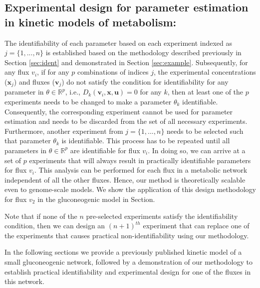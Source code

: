 \documentclass[10pt]{article}
\begin{document}
\subsection{Experimental design for parameter estimation in kinetic models of metabolism:}
The identifiability of each parameter based on each experiment indexed as $j = \{1, ..., n\}$ is established based on the methodology described previously in Section \ref{sec:ident} and demonstrated in Section \ref{sec:example}. Subsequently, for any flux $v_i$, if for any $p$ combinations of indices $j$, the experimental concentrations ($\mathbf{x}_j$) and fluxes ($\mathbf{v}_j$) do not satisfy the condition for identifiability for any parameter in $\theta\in\mathbb{R}^p$, i.e., $D_k(\mathbf{v}_i, \mathbf{x}, \mathbf{u}) = 0$ for any $k$, then at least one of the $p$ experiments needs to be changed to make a parameter $\theta_k$ identifiable. Consequently, the corresponding experiment cannot be used for parameter estimation and needs to be discarded from the set of all necessary experiments. Furthermore, another experiment from $j = \{1, ..., n\}$ needs to be selected such that parameter $\theta_k$ is identifiable. This process has to be repeated until all parameters in $\theta\in\mathbb{R}^p$ are identifiable for flux $v_i$. In doing so, we can arrive at a set of $p$ experiments that will always result in practically identifiable parameters for flux $v_i$. This analysis can be performed for each flux in a metabolic network independent of all the other fluxes. Hence, our method is theoretically scalable even to genome-scale models. We show the application of this design methodology for flux $v_2$ in the gluconeogenic model in Section.

Note that if none of the $n$ pre-selected experiments satisfy the identifiability condition, then we can design an $(n+1)^{th}$ experiment that can replace one of the experiments that causes practical non-identifiability using our methodology. 

In the following sections we provide a previously published kinetic model of a small gluconeogenic network, followed by a demonstration of our methodology to establish practical identifiability and experimental design for one of the fluxes in this network.
\end{document}
